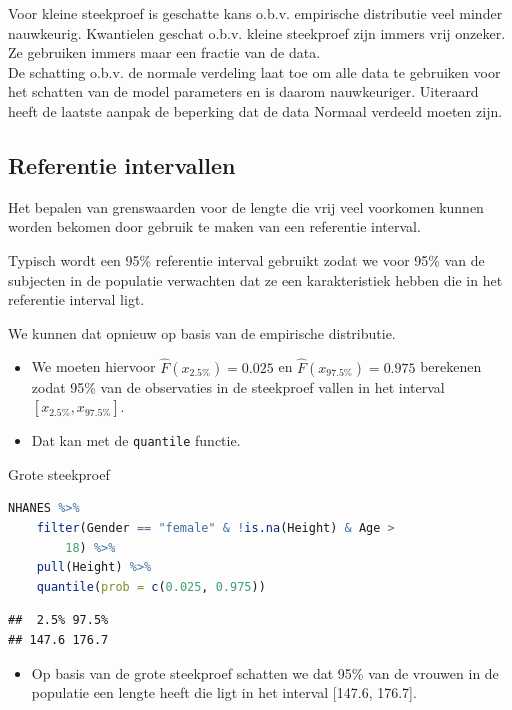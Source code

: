 \documentclass[
  12pt,dutch,coursenotes]{book}
\newcommand{\passthrough}[1]{#1}
\providecommand{\tightlist}{%
  \setlength{\itemsep}{0pt}\setlength{\parskip}{0pt}}
\begin{document}
Voor kleine steekproef is geschatte kans o.b.v. empirische distributie veel minder nauwkeurig.
Kwantielen geschat o.b.v. kleine steekproef zijn immers vrij onzeker. Ze gebruiken immers maar een fractie van de data.\\
De schatting o.b.v. de normale verdeling laat toe om alle data te gebruiken voor het schatten van de model parameters en is daarom nauwkeuriger. Uiteraard heeft de laatste aanpak de beperking dat de data Normaal verdeeld moeten zijn.

\hypertarget{referentie-intervallen}{%
\subsection{Referentie intervallen}\label{referentie-intervallen}}

Het bepalen van grenswaarden voor de lengte die vrij veel voorkomen kunnen worden bekomen door gebruik te maken van een referentie interval.

Typisch wordt een 95\% referentie interval gebruikt zodat we voor 95\% van de subjecten in de populatie verwachten dat ze een karakteristiek hebben die in het referentie interval ligt.

We kunnen dat opnieuw op basis van de empirische distributie.

\begin{itemize}
\item
  We moeten hiervoor \(\hat{F}(x_{2.5\%})=0.025\) en \(\hat{F}(x_{97.5\%})=0.975\) berekenen zodat 95\% van de observaties in de steekproef vallen in het interval \([x_{2.5\%},x_{97.5\%}]\).
\item
  Dat kan met de \passthrough{\lstinline!quantile!} functie.
\end{itemize}

Grote steekproef

\begin{lstlisting}[language=R]
NHANES %>%
    filter(Gender == "female" & !is.na(Height) & Age >
        18) %>%
    pull(Height) %>%
    quantile(prob = c(0.025, 0.975))
\end{lstlisting}

\begin{lstlisting}
##  2.5% 97.5% 
## 147.6 176.7
\end{lstlisting}

\begin{itemize}
\tightlist
\item
  Op basis van de grote steekproef schatten we dat 95\% van de vrouwen in de populatie een lengte heeft die ligt in het interval {[}147.6, 176.7{]}.
\end{itemize}
\end{document}
